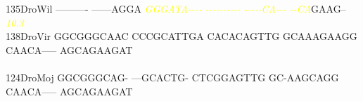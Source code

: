 \documentclass[11pt,twoside,reqno,a4paper]{article}
\begin{document}
{135\hspace*{1\charwidth}DroWil	----------	------AGGA	\textit{\textcolor{yellow}{G}}\textit{\textcolor{yellow}{G}}\textit{\textcolor{yellow}{G}}\textit{\textcolor{yellow}{A}}\textit{\textcolor{yellow}{T}}\textit{\textcolor{yellow}{A}}\textit{\textcolor{yellow}{-}}\textit{\textcolor{yellow}{-}}\textit{\textcolor{yellow}{-}}\textit{\textcolor{yellow}{-}}	\textit{\textcolor{yellow}{-}}\textit{\textcolor{yellow}{-}}\textit{\textcolor{yellow}{-}}\textit{\textcolor{yellow}{-}}\textit{\textcolor{yellow}{-}}\textit{\textcolor{yellow}{-}}\textit{\textcolor{yellow}{-}}\textit{\textcolor{yellow}{-}}\textit{\textcolor{yellow}{-}}\textit{\textcolor{yellow}{-}}	\textit{\textcolor{yellow}{-}}\textit{\textcolor{yellow}{-}}\textit{\textcolor{yellow}{-}}\textit{\textcolor{yellow}{-}}\textit{\textcolor{yellow}{-}}\textit{\textcolor{yellow}{C}}\textit{\textcolor{yellow}{A}}\textit{\textcolor{yellow}{-}}\textit{\textcolor{yellow}{-}}\textit{\textcolor{yellow}{-}}	\textit{\textcolor{yellow}{-}}\textit{\textcolor{yellow}{-}}\textit{\textcolor{yellow}{C}}\textit{\textcolor{yellow}{A}}GAAG--	\\
\hspace*{4\charwidth}\hspace*{7\charwidth}\hspace*{1\charwidth}\hspace*{1\charwidth}\hspace*{20\charwidth}\textit{\textcolor{yellow}{10.3}}\hspace*{1\charwidth}\hspace*{1\charwidth}\hspace*{1\charwidth}\hspace*{1\charwidth}\\
138\hspace*{1\charwidth}DroVir	GGCGGGCAAC	CCCGCATTGA	CACACAGTTG	GCAAAGAAGG	CAACA-----	AGCAGAAGAT	\\
\hspace*{4\charwidth}\hspace*{7\charwidth}\hspace*{1\charwidth}\hspace*{1\charwidth}\hspace*{1\charwidth}\hspace*{1\charwidth}\hspace*{1\charwidth}\hspace*{1\charwidth}\\
124\hspace*{1\charwidth}DroMoj	GGCGGGCAG-	---GCACTG-	CTCGGAGTTG	GC-AAGCAGG	CAACA-----	AGCAGAAGAT	\\
}
\end{document}
